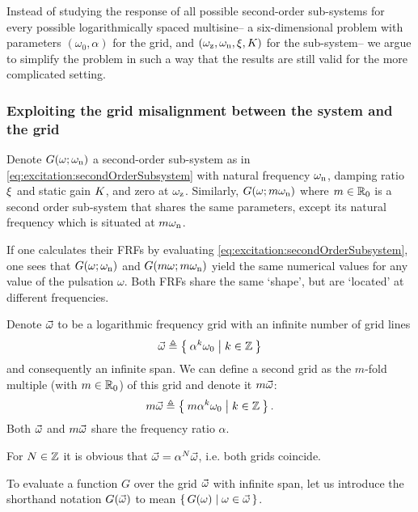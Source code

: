   Instead of studying the response of all possible second-order sub-systems for every possible logarithmically spaced multisine-- a six-dimensional problem with parameters $(\omega_0, \alpha)$ for the grid, and $(\omega_{\mathrm{z}}, \omega_{\mathrm{n}}, \xi_{}, K_{})$ for the sub-system-- we argue to simplify the problem in such a way that the results are still valid for the more complicated setting.

  \subsubsection[Exploiting the grid misalignment]{Exploiting the grid misalignment between the system and the grid}
  Denote $G(\omega; \omega_{\mathrm{n}})$ a second-order sub-system as in \eqref{eq:excitation:secondOrderSubsystem} with natural frequency $\omega_{\mathrm{n}}$, damping ratio $\xi_{}$ and static gain $K_{}$, and zero at $\omega_{\mathrm{z}}$.
  Similarly, $G(\omega; m\omega_{\mathrm{n}})$ where $m \in {\ensuremath{\mathbb{R}}}_{0}$ is a second order sub-system that shares the same parameters, except its natural frequency which is situated at $m\omega_{\mathrm{n}}$.

  If one calculates their \glspl{FRF} by evaluating \eqref{eq:excitation:secondOrderSubsystem}, one sees that $G(\omega; \omega_{\mathrm{n}})$ and $G(m\omega; m\omega_{\mathrm{n}})$ yield the same numerical values for any value of the pulsation $\omega$.
  Both \glspl{FRF} share the same `shape', but are `located' at different frequencies.

  Denote $\vec{\omega}$ to be a logarithmic frequency grid with an infinite number of grid lines
  \begin{equation}
    \vec{\omega} \triangleq \Set{\alpha^k \omega_0 | k \in \ensuremath{\mathbb{Z}}}
    \label{eq:excitation:freqGridLog}
  \end{equation}
  and consequently an infinite span.
  We can define a second grid as the $m$-fold multiple (with $m \in {\ensuremath{\mathbb{R}}}_{0}$) of this grid and denote it $m\vec{\omega}$:
  \begin{equation}
    m \vec{\omega} \triangleq \Set{m \alpha^k \omega_0 | k \in \ensuremath{\mathbb{Z}}}
    \text{.}
  \end{equation}
  Both $\vec{\omega}$ and $m\vec{\omega}$ share the frequency ratio $\alpha$.
  \begin{remark} \label{rem:excitation:exc:gridscaling}
    For $N \in \mathbb{Z}$ it is obvious that $\vec{\omega} = \alpha^{N} \vec{\omega}$, i.e. both grids coincide.
  \end{remark}

  \begin{definition}
  To evaluate a function $G$ over the grid $\vec{\omega}$ with infinite span, let us introduce the shorthand notation $G(\vec{\omega})$ to mean $\set{G(\omega) | \omega \in \ensuremath{\vec{\omega}}}$.
  \end{definition}

